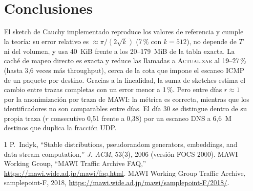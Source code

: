 \documentclass[conference]{IEEEtran}
\begin{document}
\section{Conclusiones}
El sketch de Cauchy implementado reproduce los valores de referencia y cumple la teoría: su error relativo es $\approx\pi/(2\sqrt k)$ (7\,\% con $k=512$), no depende de $T$ ni del volumen, y usa 40~KiB frente a los 20--179~MiB de la tabla exacta. La caché de mapeo directo es exacta y reduce las llamadas a \textsc{Actualizar} al 19--27\,\% (hasta 3,6 veces más throughput), cerca de la cota que impone el escaneo ICMP de un paquete por destino. Gracias a la linealidad, la suma de sketches estima el cambio entre trazas completas con un error menor a 1\,\%. Pero entre días $r\approx1$ por la anonimización por traza de MAWI: la métrica es correcta, mientras que los identificadores no son comparables entre días. El día 30 se distingue dentro de su propia traza ($r$ consecutivo 0,51 frente a 0,38) por un escaneo DNS a 6,6~M destinos que duplica la fracción UDP.

\begin{thebibliography}{1}
 P.~Indyk, ``Stable distributions, pseudorandom generators, embeddings, and data stream computation,'' \emph{J. ACM}, 53(3), 2006 (versión FOCS 2000).
 MAWI Working Group, ``MAWI Traffic Archive FAQ,'' \url{https://mawi.wide.ad.jp/mawi/faq.html}.
 MAWI Working Group Traffic Archive, samplepoint-F, 2018, \url{https://mawi.wide.ad.jp/mawi/samplepoint-F/2018/}.
\end{thebibliography}
\end{document}
